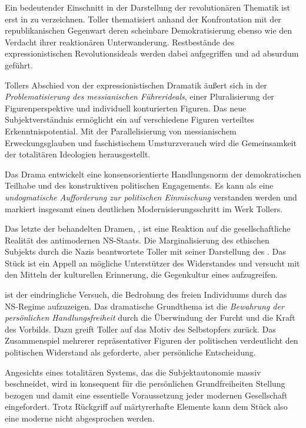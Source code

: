 Ein bedeutender Einschnitt in der Darstellung der revolutionären Thematik ist
erst in
 zu verzeichnen. Toller thematisiert anhand der
Konfrontation mit der republikanischen Gegenwart deren scheinbare
Demokratisierung ebenso wie den Verdacht ihrer reaktionären Unterwanderung. 
Restbestände des expressionistischen Revolutionsideals werden dabei
aufgegriffen und ad absurdum geführt. 

Tollers Abschied von der expressionistischen Dramatik äußert sich in der
\emph{Problematisierung des messianischen Führerideals}, einer Pluralisierung der
Figurenperspektive und individuell konturierten Figuren. Das neue
Subjektverständnis ermöglicht ein auf verschiedene Figuren verteiltes
Erkenntnispotential. Mit der Parallelisierung von messianischem
Erweckungsglauben und faschistischem Umsturzverauch wird die Gemeinsamkeit der
totalitären Ideologien herausgestellt. 

Das Drama entwickelt eine konsensorientierte Handlungsnorm der demokratischen
Teilhabe und des konstruktiven politischen Engagements. Es kann als eine
\emph{undogmatische Aufforderung zur politischen Einmischung} verstanden werden und
markiert insgesamt einen deutlichen Modernisierungsschritt im Werk Tollers.

Das letzte der behandelten Dramen, , ist eine Reaktion auf die
gesellschaftliche Realität des antimodernen NS-Staats. Die Marginalisierung
des ethischen Subjekts durch die Nazis beantwortete Toller mit seiner
Darstellung des . Das Stück ist ein Appell 
an mögliche Unterstützer des Widerstandes und versucht mit den Mitteln der
kulturellen Erinnerung, die Gegenkultur eines \Cite{anderen Deutschlands}
aufzugreifen.

 ist der eindringliche Versuch, die Bedrohung des freien
Individuums durch das NS-Regime aufzuzeigen. Das dramatische Grundthema ist
die \emph{Bewahrung der persönlichen Handlungsfreiheit} durch die Überwindung der Furcht
und die Kraft des Vorbilds. Dazu greift Toller auf das Motiv des Selbstopfers
zurück. Das Zusammenspiel mehrerer repräsentativer Figuren der politischen
 verdeutlicht den politischen Widerstand als geforderte, aber
persönliche Entscheidung. 

Angesichts eines totalitären Systems, das die Subjektautonomie massiv
beschneidet, wird in  konsequent für die persönlichen
Grundfreiheiten Stellung bezogen und damit eine essentielle Voraussetzung
jeder modernen Gesellschaft eingefordert. Trotz Rückgriff auf märtyrerhafte
Elemente kann dem Stück also eine moderne  nicht abgesprochen
werden. 

